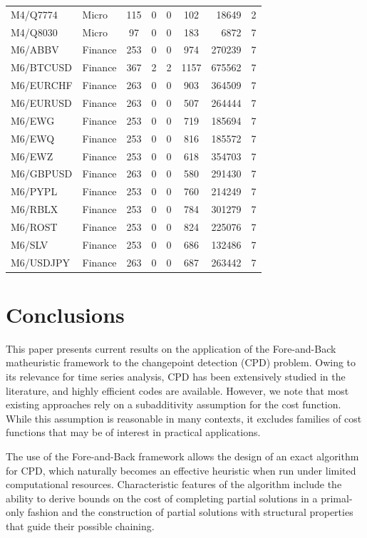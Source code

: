 \documentclass[runningheads]{llncs}
\begin{document}
\begin{table}
\begin{tabular}{llc|cc|cr|c}
M4/Q7774  & Micro        & 115 &  0 & 0 & 102 & 18649 & 2 \\
M4/Q8030  & Micro        &  97 &  0 & 0 & 183 & 6872 & 7 \\
M6/ABBV   & Finance      & 253 &  0 & 0 & 974 & 270239 & 7 \\
M6/BTCUSD & Finance      & 367 &  2 & 2 &1157 & 675562 & 7 \\
M6/EURCHF & Finance      & 263 &  0 & 0 & 903 & 364509 & 7 \\
M6/EURUSD & Finance      & 263 &  0 & 0 & 507 & 264444 & 7 \\
M6/EWG    & Finance      & 253 &  0 & 0 & 719 & 185694 & 7 \\
M6/EWQ    & Finance      & 253 &  0 & 0 & 816 & 185572 & 7 \\
M6/EWZ    & Finance      & 253 &  0 & 0 & 618 & 354703 & 7 \\
M6/GBPUSD & Finance      & 263 &  0 & 0 & 580 & 291430 & 7 \\
M6/PYPL   & Finance      & 253 &  0 & 0 & 760 & 214249 & 7 \\
M6/RBLX   & Finance      & 253 &  0 & 0 & 784 & 301279 & 7 \\
M6/ROST   & Finance      & 253 &  0 & 0 & 824 & 225076 & 7 \\
M6/SLV    & Finance      & 253 &  0 & 0 & 686 & 132486 & 7 \\
M6/USDJPY & Finance      & 263 &  0 & 0 & 687 & 263442 & 7 \\
		\hline
	\end{tabular}
\end{table}


\section{Conclusions}		\label{sec:conclusions}

This paper presents current results on the application of the Fore-and-Back matheuristic framework to the changepoint detection (CPD) problem. Owing to its relevance for time series analysis, CPD has been extensively studied in the literature, and highly efficient codes are available. However, we note that most existing approaches rely on a subadditivity assumption for the cost function. While this assumption is reasonable in many contexts, it excludes families of cost functions that may be of interest in practical applications.

The use of the Fore-and-Back framework allows the design of an exact algorithm for CPD, which naturally becomes an effective heuristic when run under limited computational resources. Characteristic features of the algorithm include the ability to derive bounds on the cost of completing partial solutions in a primal-only fashion and the construction of partial solutions with structural properties that guide their possible chaining.
\end{document}
